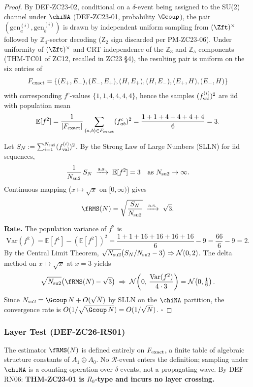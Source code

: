 \documentclass[12pt, a4paper]{article}
\begin{document}
\begin{proof}
By DEF-ZC23-02, conditional on a $\delta$-event being assigned
to the SU(2) channel under $\chiNA$ (DEF-ZC23-01, probability
$\Gcoup$), the pair $(\mathrm{gen}_a^{(i)}, \mathrm{gen}_b^{(i)})$
is drawn by independent uniform sampling from $(\Zft)^\times$
followed by $\mathbb{Z}_4$-sector decoding (Z$_2$ sign discarded
per PM-ZC23-06). Under uniformity of $(\Zft)^\times$ and CRT
independence of the $\mathbb{Z}_3$ and $\mathbb{Z}_5$ components
(THM-TC01 of ZC12, recalled in ZC23 §4), the resulting pair is
uniform on the six entries of
\[
  F_{\rm exact} = \{(E_+, E_-), (E_-, E_+),
                    (H, E_+), (H, E_-),
                    (E_+, H), (E_-, H)\}
\]
with corresponding $f^c$-values $\{1, 1, 4, 4, 4, 4\}$, hence
the samples $(f_{\rm val}^{(i)})^2$ are iid with population
mean
\[
  \mathbb{E}[f^2]
    = \frac{1}{|F_{\rm exact}|}\sum_{(a,b)\in F_{\rm exact}}
      (f^c_{ab})^2
    = \frac{1+1+4+4+4+4}{6} = 3.
\]

Let $S_N := \sum_{i=1}^{N_{\rm su2}} (f_{\rm val}^{(i)})^2$.
By the Strong Law of Large Numbers (SLLN) for iid sequences,
\[
  \frac{1}{N_{\rm su2}}\,S_N
    \;\xrightarrow{\text{a.s.}}\; \mathbb{E}[f^2] = 3
  \quad\text{as } N_{\rm su2}\to\infty.
\]
Continuous mapping ($x\mapsto\sqrt{x}$ on $[0,\infty)$) gives
\[
  \fRMS(N)
    = \sqrt{\frac{S_N}{N_{\rm su2}}}
    \;\xrightarrow{\text{a.s.}}\; \sqrt{3}.
\]

\textbf{Rate.} The population variance of $f^2$ is
\[
  \mathrm{Var}(f^2)
    = \mathbb{E}[f^4] - (\mathbb{E}[f^2])^2
    = \frac{1+1+16+16+16+16}{6} - 9
    = \frac{66}{6} - 9 = 2.
\]
By the Central Limit Theorem,
$\sqrt{N_{\rm su2}}\bigl(S_N/N_{\rm su2} - 3\bigr)
\Rightarrow \mathcal{N}(0, 2)$. The delta method on
$x\mapsto\sqrt{x}$ at $x=3$ yields
\[
  \sqrt{N_{\rm su2}}\bigl(\fRMS(N) - \sqrt{3}\bigr)
    \;\Rightarrow\; \mathcal{N}\!\left(0,\,
      \frac{\mathrm{Var}(f^2)}{4\cdot 3}\right)
    = \mathcal{N}\!\left(0, \tfrac{1}{6}\right).
\]
Since $N_{\rm su2} = \Gcoup\,N + O(\sqrt{N})$ by SLLN on
the $\chiNA$ partition, the convergence rate is
$O(1/\sqrt{\Gcoup\,N}) = O(1/\sqrt{N})$.
\hfill$\square$
\end{proof}

\subsubsection{Layer Test (DEF-ZC26-RS01)}

\begin{derivedbox}[title={Layer test for THM-ZC23-01}]
The estimator $\fRMS(N)$ is defined entirely on
$F_{\rm exact}$, a finite table of algebraic structure
constants of $A_1\oplus A_0$. No $\mathcal{R}$-event enters
the definition; sampling under $\chiNA$ is a counting
operation over $\delta$-events, not a propagating wave.
By DEF-RN06: \textbf{THM-ZC23-01 is $R_0$-type and incurs
no layer crossing.}
\end{derivedbox}
\end{document}
